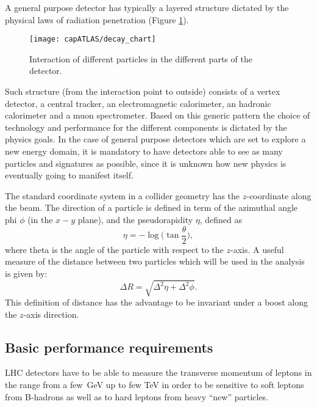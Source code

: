 A general purpose detector has typically a layered structure dictated by the physical laws of radiation penetration (Figure \ref{interact}).
\begin{figure}[htb]
\begin{center}
\texttt{[image: capATLAS/decay\_chart]}
\caption{Interaction of different particles in the different parts of the detector.}
\label{interact}
\end{center}
\end{figure} 
Such structure (from the interaction point to outside) consists of a vertex detector, a central tracker, an electromagnetic calorimeter, an hadronic calorimeter and a muon spectrometer. Based on this generic pattern the choice of technology and performance for the different components is dictated by the physics goals. In the case of general purpose detectors which are set to explore a new energy domain, it is mandatory to have detectors able to see as many particles and signatures as possible, since it is unknown how new physics is eventually going to manifest itself.

The standard coordinate system in a collider geometry has the $z$-coordinate along the beam. The direction of a particle is defined in term  of the azimuthal angle phi $\phi$ (in the $x-y$ plane), and the pseudorapidity $\eta$, defined as
\begin{equation}\label{eq:pseudoR}
\eta = -\log \bigg( \tan \dfrac{\theta}{2} \bigg),
\end{equation} 
where theta is the angle of the particle with respect to the $z$-axis.
A useful measure of the distance between two particles which will
be used in the analysis is given by: 
\begin{equation}
\label{eq:deltaR}
\Delta R = \sqrt{\Delta^{2}\eta + \Delta^{2}\phi}.
\end{equation} 
This definition of distance has the advantage to be invariant under a boost along the $z$-axis direction.


\subsection{Basic performance requirements}
LHC detectors have to be able to measure the transverse momentum of leptons in the range from a few~GeV up to few TeV in order to be sensitive to soft leptons from B-hadrons as well as to hard leptons from heavy ``new'' particles.

